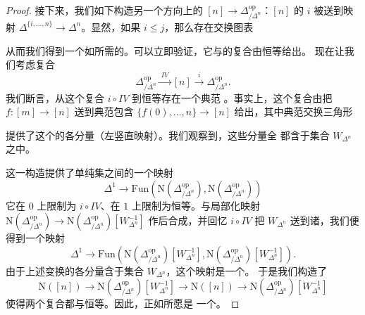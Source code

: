 \begin{proof}
接下来，我们如下构造另一个方向上的\trFunctor{}%
$[n] \to \Delta^{\mathrm{op}}_{/\Delta^n}$：$[n]$ 的\trObject{} $i$ 被送到映射
$\Delta^{\{i,\dotsc,n\}} \to \Delta^n$。显然，如果 $i \le j$，那么存在交换图表
\begin{center}
\end{center}
从而我们得到一个如所需的\trFunctor{}。可以立即验证，它与\trInitialVertexMap{}的复合由恒等给出。
现在让我们考虑复合
\[
\Delta^{\mathrm{op}}_{/\Delta^n}
\xrightarrow{\ IV\ }
[n]
\xrightarrow{\ i\ }
\Delta^{\mathrm{op}}_{/\Delta^n}.
\]
我们断言，从这个复合 $i \circ IV$ 到恒等\trFunctor{}存在一个典范%
\trNaturalTransformation{}。事实上，这个复合由把 $f\colon [m] \to [n]$ 送到典范包含
$\{f(0), \dotsc, n\} \to [n]$ 给出，其中典范交换三角形
\begin{center}
\end{center}
提供了这个\trNaturalTransformation{}的各分量（左竖直映射）。我们观察到，这些分量全
都含于集合 $W_{\Delta^n}$ 之中。

这一构造提供了单纯集之间的一个映射
\[
\Delta^1 \to
\mathrm{Fun}(\mathrm{N}(\Delta^{\mathrm{op}}_{/\Delta^n}),
\mathrm{N}(\Delta^{\mathrm{op}}_{/\Delta^n}))
\]
它在 $0$ 上限制为 $i \circ IV$、在 $1$ 上限制为恒等。与局部化映射 $\mathrm{N}(\Delta^{\mathrm{op}}_{/\Delta^n}) \to \mathrm{N}(\Delta^{\mathrm{op}}_{/\Delta^n})[W_{\Delta^n}^{-1}]$ 作后合成，并回忆
$i \circ IV$ 把 $W_{\Delta^n}$ 送到诸\trEquivalence{}，我们便得到一个映射
\[
\Delta^1 \to
\mathrm{Fun}(\mathrm{N}(\Delta^{\mathrm{op}}_{/\Delta^n})[W_{\Delta^n}^{-1}],
\mathrm{N}(\Delta^{\mathrm{op}}_{/\Delta^n})[W_{\Delta^n}^{-1}]).
\]
由于上述变换的各分量含于集合 $W_{\Delta^n}$，这个映射是一个\trNaturalEquivalence{}。
于是我们构造了\trFunctor{}%
\[
\mathrm{N}([n]) \to
\mathrm{N}(\Delta^{\mathrm{op}}_{/\Delta^n})[W_{\Delta^n}^{-1}] \to
\mathrm{N}([n]) \to
\mathrm{N}(\Delta^{\mathrm{op}}_{/\Delta^n})[W_{\Delta^n}^{-1}]
\]
使得两个复合都与恒等\trFunctor{}\trNaturalEquivalence{}。因此，\trInitialVertexMap{}正如所愿是
一个\trJoyalEquivalence{}。
\end{proof}

